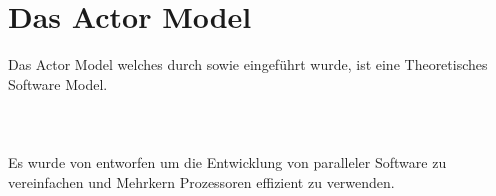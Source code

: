\chapter{Das Actor Model}
Das Actor Model welches durch \cite{hewitt1973session} sowie \cite{Agha1985ActorsSystems} eingeführt wurde, ist eine Theoretisches Software Model. 
\citet{hewitt1973session} \\
\citep{hewitt1973session} \\
\citeauthor{hewitt1973session} \\
\citealt{hewitt1973session} \\

Es wurde von \cite{hewitt1973session} entworfen um die Entwicklung von paralleler Software zu vereinfachen und Mehrkern Prozessoren effizient zu verwenden.